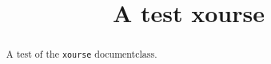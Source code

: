 \documentclass{xourse}
\title{A test xourse}
\begin{document}
\begin{abstract}
  A test of the \texttt{xourse} documentclass.
\end{abstract}
\maketitle

\end{document}

